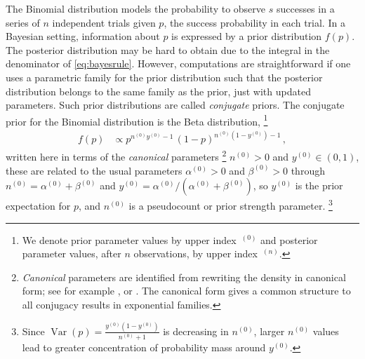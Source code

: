 \documentclass[runningheads,a4paper]{llncs}
\newcommand{\uz}{^{(0)}} %
\newcommand{\un}{^{(n)}} %
\def\yz{y\uz}
\def\nz{n\uz}
\newcommand{\az}{\alpha\uz}
\newcommand{\bz}{\beta\uz}
\newcommand{\V}{\operatorname{Var}}
\newcommand{\bin}{\operatorname{Binom}} %
\begin{document}
%
%
The Binomial distribution models the probability to observe $s$ successes in a series of $n$ independent trials
given $p$, the success probability in each trial.
%
In a Bayesian setting, information about $p$ is expressed by a prior distribution $f(p)$.
The posterior distribution may be hard to obtain due to the integral in the denominator of \eqref{eq:bayesrule}.
%
However, computations are straightforward if one uses a parametric family for the prior distribution such that
the posterior distribution belongs to the same family as the prior, just with updated parameters.
Such prior distributions are called \emph{conjugate} priors.
The conjugate prior for the Binomial distribution is the Beta distribution,%
\footnote{We denote prior parameter values by upper index~${}\uz$ and posterior parameter values, after $n$ observations,
by upper index~${}\un$.}
\begin{align}
f(p) &\propto p^{\nz\yz-1}\, (1-p)^{\nz(1-\yz)-1}\,,
\label{eq:betadensny}
\end{align}
written here in terms of the \emph{canonical} parameters%
\footnote{\emph{Canonical} parameters are identified from rewriting the density in canonical form;
see for example \cite[pp.~202 and 272f]{2000:bernardosmith}, or \cite[\S 1.2.3.1]{2013:diss-gw}.
The canonical form gives a common structure to all conjugacy results in exponential families.}
$\nz > 0$ and $\yz \in (0,1)$,
these are related to the usual parameters $\az > 0$ and $\bz > 0$ through
$\nz = \az + \bz$ and $\yz = \az / (\az+\bz)$,
so $\yz$ is the prior expectation for $p$,
and $\nz$ is a pseudocount or prior strength parameter.%
\footnote{Since $\V(p) = \frac{\yz (1-\yz)}{\nz + 1}$ is decreasing in $\nz$,
larger $\nz$ values lead to greater concentration of probability mass around $\yz$.}
\end{document}
